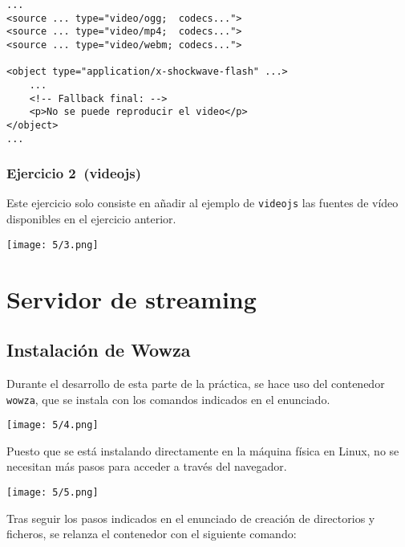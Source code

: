 \begin{verbatim}
...
<source ... type="video/ogg;  codecs...">
<source ... type="video/mp4;  codecs...">
<source ... type="video/webm; codecs...">

<object type="application/x-shockwave-flash" ...>
	...
	<!-- Fallback final: -->
	<p>No se puede reproducir el video</p>
</object>
...
\end{verbatim}

\subsubsection{Ejercicio 2~(videojs)}
Este ejercicio solo consiste en añadir al ejemplo de \Verb#videojs# las fuentes de vídeo
disponibles en el ejercicio anterior.

\begin{minipage}{\linewidth}
	\centering
	\texttt{[image: 5/3.png]}
	\label{fig:5/3}
\end{minipage}

\section{Servidor de streaming}
\subsection{Instalación de Wowza}
Durante el desarrollo de esta parte de la práctica, se hace uso del contenedor \Verb#wowza#,
que se instala con los comandos indicados en el enunciado.

\begin{minipage}{\linewidth}
	\centering
	\texttt{[image: 5/4.png]}
	\label{fig:5/4}
\end{minipage}

Puesto que se está instalando directamente en la máquina física en Linux, no se necesitan
más pasos para acceder a través del navegador.

\begin{minipage}{\linewidth}
	\centering
	\texttt{[image: 5/5.png]}
	\label{fig:5/5}
\end{minipage}

Tras seguir los pasos indicados en el enunciado de creación de directorios y ficheros,
se relanza el contenedor con el siguiente comando:

